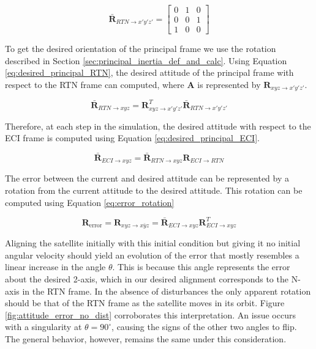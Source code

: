 \begin{equation*}
    \boldsymbol{\bar{R}}_{RTN \rightarrow x'y'z'} = \begin{bmatrix}
        0 & 1 & 0 \\ 0 & 0 & 1 \\ 1 & 0 & 0
    \end{bmatrix}
\end{equation*}

To get the desired orientation of the principal frame we use the rotation described in Section \ref{sec:principal_inertia_def_and_calc}. Using Equation \ref{eq:desired_principal_RTN}, the desired attitude of the principal frame with respect to the RTN frame can computed, where $\boldsymbol{A}$ is represented by $\boldsymbol{R}_{xyz \rightarrow x'y'z'}$.

\begin{equation} \label{eq:desired_principal_RTN}
    \boldsymbol{\bar{R}}_{RTN \rightarrow xyz} = \boldsymbol{R}_{xyz \rightarrow x'y'z'}^T \boldsymbol{\bar{R}}_{RTN \rightarrow x'y'z'}
\end{equation}

Therefore, at each step in the simulation, the desired attitude with respect to the ECI frame is computed using Equation \ref{eq:desired_principal_ECI}.

\begin{equation} \label{eq:desired_principal_ECI}
    \boldsymbol{\bar{R}}_{ECI \rightarrow xyz} = \boldsymbol{\bar{R}}_{RTN \rightarrow xyz} \boldsymbol{R}_{ECI \rightarrow RTN}
\end{equation}

The error between the current and desired attitude can be represented by a rotation from the current attitude to the desired attitude. This rotation can be computed using Equation \ref{eq:error_rotation}

\begin{equation} \label{eq:error_rotation}
    \boldsymbol{R}_{\text{error}} = \boldsymbol{R}_{xyz \rightarrow \overline{xyz}} = \boldsymbol{\bar{R}}_{ECI \rightarrow xyz} \boldsymbol{R}_{ECI \rightarrow xyz}^T
\end{equation}

Aligning the satellite initially with this initial condition but giving it no initial angular velocity should yield an evolution of the error that mostly resembles a linear increase in the angle $\theta$. This is because this angle represents the error about the desired 2-axis, which in our desired alignment corresponds to the N-axis in the RTN frame. In the absence of disturbances the only apparent rotation should be that of the RTN frame as the satellite moves in its orbit. Figure \ref{fig:attitude_error_no_dist} corroborates this interpretation. An issue occurs with a singularity at $\theta = 90^\circ$, causing the signs of the other two angles to flip. The general behavior, however, remains the same under this consideration.

